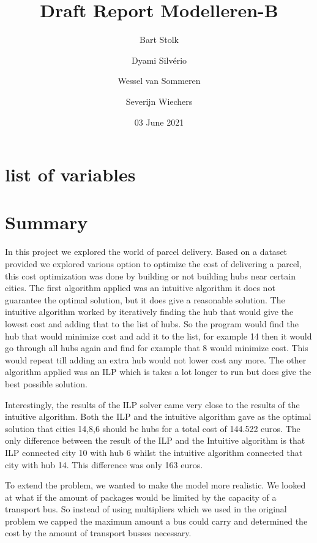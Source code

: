 \documentclass{article}
\title{Draft Report Modelleren-B}
\author{Bart Stolk \and Dyami Silvério \and Wessel van Sommeren \and Severijn Wiechers}
\date{03 June 2021}
\begin{document}
\maketitle


\newpage
\section*{list of variables}


\newpage
\section*{Summary}
In this project we explored the world of parcel delivery. Based on a dataset provided we explored various option to optimize the cost of delivering a parcel, this cost optimization was done by building or not building hubs near certain cities. The first algorithm applied was an intuitive algorithm it does not guarantee the optimal solution, but it does give a reasonable solution. The intuitive algorithm worked by iteratively finding the hub that would give the lowest cost and adding that to the list of hubs. So the program would find the hub that would minimize cost and add it to the list, for example 14 then it would go through all hubs again and find for example that 8 would minimize cost. This would repeat till adding an extra hub would not lower cost any more. The other algorithm applied was an ILP which is takes a lot longer to run but does give the best possible solution.

Interestingly, the results of the ILP solver came very close to the results of the intuitive algorithm. Both the ILP and the intuitive algorithm gave as the optimal solution that cities 14,8,6 should be hubs for a total cost of 144.522 euros. The only difference between the result of the ILP and the Intuitive algorithm is that ILP connected city 10 with hub 6 whilst the intuitive algorithm connected that city with hub 14. This difference was only 163 euros. 

To extend the problem, we wanted to make the model more realistic. We looked at what if the amount of packages would be limited by the capacity of a transport bus. So instead of using multipliers which we used in the original problem we capped the maximum amount a bus could carry and determined the cost by the amount of transport busses necessary. 
\end{document}
